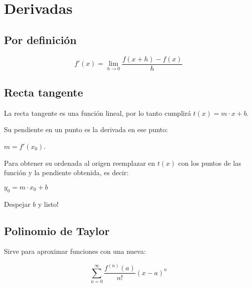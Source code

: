 \section{Derivadas}


\begin{multicols}{2}
\subsection*{Por definición}

$$f'(x) = \lim\limits_{h\rightarrow 0}\dfrac{f(x+h) - f(x)}{h}$$


\subsection*{Recta tangente}

La recta tangente es una función lineal, por lo tanto cumplirá $t(x) = m\cdot x + b$.

\noindent
Su pendiente en un punto es la derivada en ese punto:

\hfil$m=f'(x_0)$.\hfil

\noindent
Para obtener su ordenada al origen reemplazar en $t(x)$ con los puntos de las función y la pendiente obtenida, es decir:

\hfil$ y_0 = m \cdot x_0 + b $\hfil

\noindent
Despejar $b$ y listo!

\subsection*{Polinomio de Taylor}

Sirve para aproximar funciones con una nueva:

$$\sum \limits_{n=0}^\infty \frac {{f^{(n)}} (a)}{n!} (x-a)^n$$
\vfill



\end{multicols}
